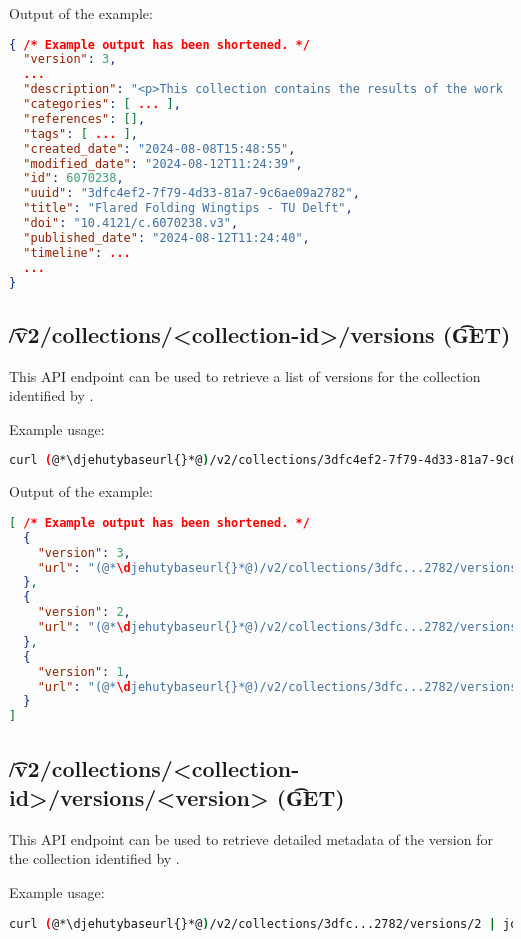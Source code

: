   Output of the example:
\begin{lstlisting}[language=JSON]
{ /* Example output has been shortened. */
  "version": 3,
  ...
  "description": "<p>This collection contains the results of the work ...",
  "categories": [ ... ],
  "references": [],
  "tags": [ ... ],
  "created_date": "2024-08-08T15:48:55",
  "modified_date": "2024-08-12T11:24:39",
  "id": 6070238,
  "uuid": "3dfc4ef2-7f79-4d33-81a7-9c6ae09a2782",
  "title": "Flared Folding Wingtips - TU Delft",
  "doi": "10.4121/c.6070238.v3",
  "published_date": "2024-08-12T11:24:40",
  "timeline": ...
  ...
}
\end{lstlisting}

\subsection{\t{/v2/collections/<collection-id>/versions} (\t{GET})}

  This API endpoint can be used to retrieve a list of versions for the collection
  identified by .

  Example usage:
\begin{lstlisting}[language=bash]
curl (@*\djehutybaseurl{}*@)/v2/collections/3dfc4ef2-7f79-4d33-81a7-9c6ae09a2782/versions | jq
\end{lstlisting}

  Output of the example:
\begin{lstlisting}[language=JSON]
[ /* Example output has been shortened. */
  {
    "version": 3,
    "url": "(@*\djehutybaseurl{}*@)/v2/collections/3dfc...2782/versions/3"
  },
  {
    "version": 2,
    "url": "(@*\djehutybaseurl{}*@)/v2/collections/3dfc...2782/versions/2"
  },
  {
    "version": 1,
    "url": "(@*\djehutybaseurl{}*@)/v2/collections/3dfc...2782/versions/1"
  }
]
\end{lstlisting}

\subsection{\t{/v2/collections/<collection-id>/versions/<version>} (\t{GET})}

  This API endpoint can be used to retrieve detailed metadata of the version
   for the collection identified by .

  Example usage:
\begin{lstlisting}[language=bash]
curl (@*\djehutybaseurl{}*@)/v2/collections/3dfc...2782/versions/2 | jq
\end{lstlisting}

